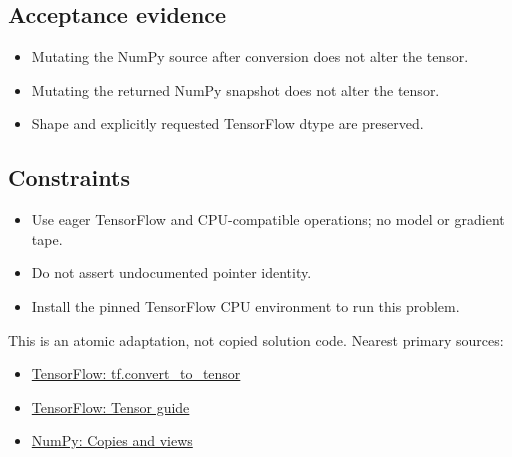         \subsection{Acceptance evidence}

        \begin{evidencebox}
        \begin{itemize}
          \item Mutating the NumPy source after conversion does not alter the tensor.
  \item Mutating the returned NumPy snapshot does not alter the tensor.
  \item Shape and explicitly requested TensorFlow dtype are preserved.
        \end{itemize}
        \end{evidencebox}

        \subsection{Constraints}

        \begin{itemize}
          \item Use eager TensorFlow and CPU-compatible operations; no model or gradient tape.
  \item Do not assert undocumented pointer identity.
  \item Install the pinned TensorFlow CPU environment to run this problem.
        \end{itemize}

        \begin{sourcebox}
        This is an atomic adaptation, not copied solution code. Nearest primary sources:
        \begin{itemize}
          \item \href{https://www.tensorflow.org/api_docs/python/tf/convert_to_tensor}{TensorFlow: tf.convert\_to\_tensor}
  \item \href{https://www.tensorflow.org/guide/tensor}{TensorFlow: Tensor guide}
  \item \href{https://numpy.org/doc/stable/user/basics.copies.html}{NumPy: Copies and views}
        \end{itemize}
        \end{sourcebox}
